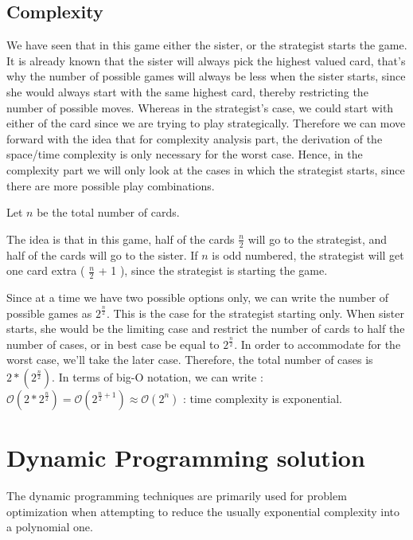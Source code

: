 \documentclass[a4paper,12pt,fleqn]{article}
\newcommand\ezskip{\medskip\noindent}
\begin{document}
\subsection{Complexity}
We have seen that in this game either the sister, or the strategist starts the game. It is already known that the sister will always pick the highest valued card, that's why the number of possible games will always be less when the sister starts, since she would always start with the same highest card, thereby restricting the number of possible moves. Whereas in the strategist's case, we could start with either of the card since we are trying to play strategically. Therefore we can move forward with the idea that for complexity analysis part, the derivation of the space/time complexity is only necessary for the worst case. Hence, in the complexity part we will only look at the cases in which the strategist starts, since there are more possible play combinations.

\ezskip
Let $n$ be the total number of cards.

The idea is that in this game, half of the cards \(\frac{n}{2}\) will go to the strategist, and half of the cards will go to the sister. If $n$ is odd numbered, the strategist will get one card extra ( \(\frac{n}{2}\) + 1 ), since the strategist is starting the game.

Since at a time we have two possible options only, we can write the number of possible games as \(2^{\frac{n}{2}} \). This is the case for the strategist starting only. When sister starts, she would be the limiting case and restrict the number of cards to half the number of cases, or in best case be equal to \(2^{\frac{n}{2}} \). In order to accommodate for the worst case, we’ll take the later case.
Therefore, the total number of cases is $2 * (2^{\frac{n}{2}})$. In terms of big-O notation, we can write : $
\mathcal{O}(2 * 2^{\frac{n}{2}} )  
 = \mathcal{O}( 2^{\frac{n}{2} + 1} )
 \approx \mathcal{O}( 2^{n} )
$ : time complexity is exponential.


\newpage


\section{Dynamic Programming solution} \label{sec:dp_solution}
The dynamic programming techniques are primarily used for problem optimization when attempting to reduce the usually exponential complexity into a polynomial one.
\end{document}
